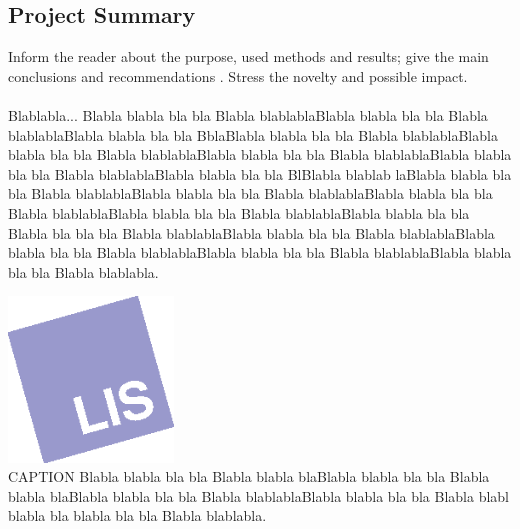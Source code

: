 \documentclass[a4paper,oneside]{report}
\begin{document}
\begin{multicols}{2} \flushcolumns

\subsection*{Project Summary}
Inform the reader about the purpose, used methods and results; 
give the main conclusions and recommendations . Stress the novelty and possible impact.
\\\\Blablabla...
Blabla blabla bla bla Blabla blablablaBlabla blabla bla bla Blabla blablablaBlabla blabla bla bla BblaBlabla blabla bla bla Blabla blablablaBlabla blabla bla bla Blabla blablablaBlabla blabla bla bla Blabla blablablaBlabla blabla bla bla Blabla blablablaBlabla blabla bla bla BlBlabla blablab laBlabla blabla bla bla Blabla blablablaBlabla blabla bla bla Blabla blablablaBlabla blabla bla bla Blabla blablablaBlabla blabla bla bla Blabla blablablaBlabla blabla bla bla Blabla bla bla bla Blabla blablablaBlabla blabla bla bla Blabla blablablaBlabla blabla bla bla Blabla blablablaBlabla blabla bla bla Blabla blablablaBlabla blabla bla bla Blabla blablabla.



\begin{minipage}{\columnwidth}
\centering
\includegraphics[width=4.4cm]{logo_vector}
\footnotesize{ %
\\CAPTION Blabla blabla bla bla Blabla blabla blaBlabla blabla bla bla Blabla blabla blaBlabla blabla bla bla Blabla blablablaBlabla blabla bla bla Blabla blabl blabla bla  blabla bla bla Blabla blablabla.
 }
\end{minipage}




\end{multicols}
\end{document}
